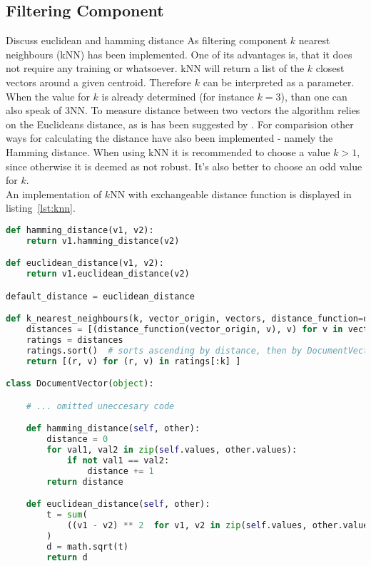 
\subsection{Filtering Component}
{\color{red}\tiny Discuss euclidean and hamming distance}
As filtering component $k$ nearest neighbours (kNN) has been implemented.
One of its advantages is, that it does not require any training or whatsoever.\citep[p.~290]{manning:2009}
kNN will return a list of the $k$ closest vectors around a given centroid.
Therefore $k$ can be interpreted as a parameter.
When the value for $k$ is already determined (for instance $k=3$), than one can also speak of 3NN.\citep[p.~297-298]{manning:2009}
To measure distance between two vectors the algorithm relies on the Euclideans distance, as is has been suggested by \citeauthor{manning:2009}.\citep[p.~292]{manning:2009}
For comparision other ways for calculating the distance have also been implemented - namely the Hamming distance.
When using kNN it is recommended to choose a value $k > 1$, since otherwise it is deemed as not robust.
It's also better to choose an odd value for $k$.\\
An implementation of $k$NN with exchangeable distance function is displayed in listing~\ref{lst:knn}.

\begin{lstlisting}[language=Python,caption={kNN and distance methods},label={lst:knn},float=h]
def hamming_distance(v1, v2):
    return v1.hamming_distance(v2)

def euclidean_distance(v1, v2):
    return v1.euclidean_distance(v2)

default_distance = euclidean_distance

def k_nearest_neighbours(k, vector_origin, vectors, distance_function=default_distance):
    distances = [(distance_function(vector_origin, v), v) for v in vectors]
    ratings = distances
    ratings.sort()  # sorts ascending by distance, then by DocumentVector
    return [(r, v) for (r, v) in ratings[:k] ]

class DocumentVector(object):

    # ... omitted uneccesary code

    def hamming_distance(self, other):
        distance = 0
        for val1, val2 in zip(self.values, other.values):
            if not val1 == val2:
                distance += 1
        return distance

    def euclidean_distance(self, other):
        t = sum(
            ((v1 - v2) ** 2  for v1, v2 in zip(self.values, other.values))
        )
        d = math.sqrt(t)
        return d
\end{lstlisting}

